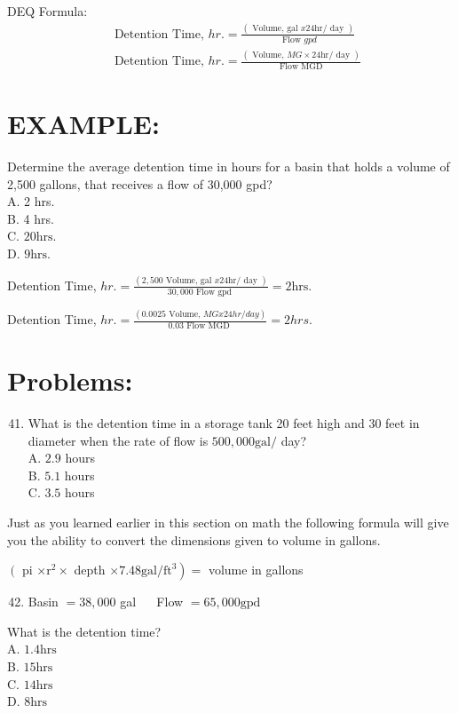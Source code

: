 \documentclass[10pt]{article}
\begin{document}
DEQ Formula:
$$
\begin{aligned}
&\text { Detention Time, } h r .=\frac{(\text { Volume, gal } x 24 \mathrm{hr} / \text { day })}{\text { Flow } g p d} \\
&\text { Detention Time, } h r .=\frac{(\text { Volume, } M G \times 24 \mathrm{hr} / \text { day })}{\text { Flow MGD }}
\end{aligned}
$$

\section{EXAMPLE:}
Determine the average detention time in hours for a basin that holds a volume of 2,500 gallons, that receives a flow of 30,000 gpd?\\
A. 2 hrs.\\
B. 4 hrs.\\
C. $20 \mathrm{hrs}$.\\
D. $9 \mathrm{hrs}$.

Detention Time, $h r .=\frac{(2,500 \text { Volume, gal } x 24 \mathrm{hr} / \text { day })}{30,000 \text { Flow gpd }}=2 \mathrm{hrs}$.

Detention Time, $h r .=\frac{(0.0025 \text { Volume, } M G x 24 h r / d a y)}{0.03 \text { Flow MGD }}=2 h r s$.

\section{Problems:}
\begin{enumerate}
  \setcounter{enumi}{40}
  \item What is the detention time in a storage tank 20 feet high and 30 feet in diameter when the rate of flow is $500,000 \mathrm{gal} /$ day?\\
A. $2.9$ hours\\
B. $5.1$ hours\\
C. $3.5$ hours
\end{enumerate}
Just as you learned earlier in this section on math the following formula will give you the ability to convert the dimensions given to volume in gallons.

$\left(\right.$ pi $\times \mathrm{r}^{2} \times$ depth $\left.\times 7.48 \mathrm{gal} / \mathrm{ft}^{3}\right)=$ volume in gallons

\begin{enumerate}
  \setcounter{enumi}{41}
  \item Basin $=38,000$ gal $\quad$ Flow $=65,000 \mathrm{gpd}$
\end{enumerate}
What is the detention time?\\
A. $1.4 \mathrm{hrs}$\\
B. $15 \mathrm{hrs}$\\
C. $14 \mathrm{hrs}$\\
D. $8 \mathrm{hrs}$
\end{document}
